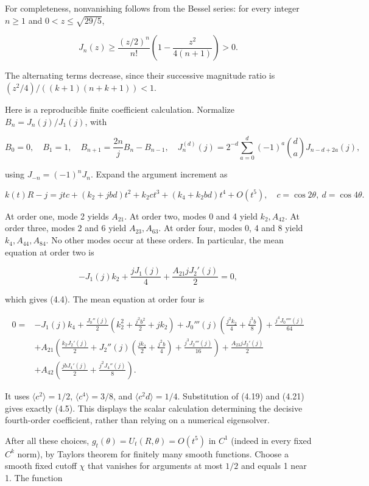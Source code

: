 \documentclass[11pt]{article}
\begin{document}
For completeness, nonvanishing follows from the Bessel series: for every
integer \(n\ge1\) and \(0<z\le\sqrt{29/5}\),

\[
J_n(z)\ge \frac{(z/2)^n}{n!}
\left(1-\frac{z^2}{4(n+1)}\right)>0.
\tag{4.20}
\]

The alternating terms decrease, since their successive magnitude ratio
is \((z^2/4)/((k+1)(n+k+1))<1\).

Here is a reproducible finite coefficient calculation. Normalize
\(B_n=J_n(j)/J_1(j)\), with

\[
B_0=0,\quad B_1=1,\quad B_{n+1}=\frac{2n}{j}B_n-B_{n-1},\quad
J_n^{(d)}(j)=2^{-d}\sum_{a=0}^d(-1)^a\binom da J_{n-d+2a}(j),
\tag{4.21}
\]

using \(J_{-n}=(-1)^nJ_n\). Expand the argument increment as

\[
k(t)R-j=j t c+(k_2+jbd)t^2+k_2c t^3+(k_4+k_2bd)t^4+O(t^5),
\quad c=\cos2\theta,\ d=\cos4\theta.
\tag{4.22}
\]

At order one, mode 2 yields \(A_{21}\). At order two, modes 0 and 4
yield \(k_2,A_{42}\). At order three, modes 2 and 6 yield
\(A_{23},A_{63}\). At order four, modes 0, 4 and 8 yield
\(k_4,A_{44},A_{84}\). No other modes occur at these orders. In
particular, the mean equation at order two is

\[
-J_1(j)k_2+\frac{jJ_1(j)}4+\frac{A_{21}jJ_2'(j)}2=0,
\tag{4.23}
\]

which gives (4.4). The mean equation at order four is

\[
\begin{aligned}
0={}&-J_1(j)k_4
+\frac{J_0''(j)}2\left(k_2^2+\frac{j^2b^2}{2}+jk_2\right)
+J_0'''(j)\left(\frac{j^2k_2}{4}+\frac{j^3b}{8}\right)
+\frac{j^4J_0''''(j)}{64}\\
&+A_{21}\left(\frac{k_2J_2'(j)}2
+J_2''(j)\left(\frac{jk_2}{2}+\frac{j^2b}{4}\right)
+\frac{j^3J_2'''(j)}{16}\right)
+\frac{A_{23}jJ_2'(j)}2\\
&+A_{42}\left(\frac{jbJ_4'(j)}2+\frac{j^2J_4''(j)}8\right).
\end{aligned}
\tag{4.24}
\]

It uses \(\langle c^2\rangle=1/2\), \(\langle c^4\rangle=3/8\), and
\(\langle c^2d\rangle=1/4\). Substitution of (4.19) and (4.21) gives
exactly (4.5). This displays the scalar calculation determining the
decisive fourth-order coefficient, rather than relying on a numerical
eigensolver.

After all these choices, \(g_t(\theta)=U_t(R,\theta)=O(t^5)\) in \(C^1\)
(indeed in every fixed \(C^k\) norm), by Taylor\textquotesingle s
theorem for finitely many smooth functions. Choose a smooth fixed cutoff
\(\chi\) that vanishes for arguments at most \(1/2\) and equals 1 near
1. The function
\end{document}
